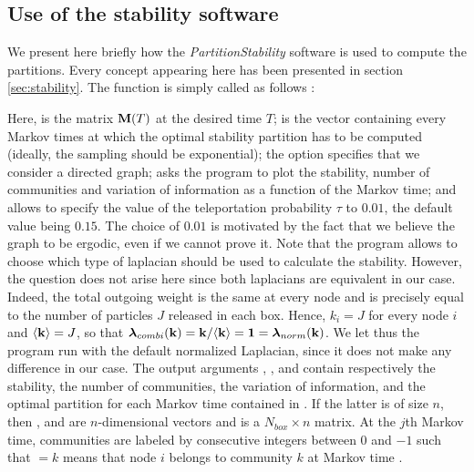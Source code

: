 \subsection{Use of the stability software}
We present here briefly how the \textit{PartitionStability} software is used to compute the partitions. Every concept appearing here has been presented in section \ref{sec:stability}. The  function is simply called as follows : \vspace{-.2cm}
\begin{center}
\end{center} %
Here,  is the matrix $\mathbf M(T)$ at the desired time $T$;  is the vector containing every Markov times at which the optimal stability partition has to be computed (ideally, the sampling should be exponential); the  option specifies that we consider a directed graph;  asks the program to plot the stability, number of communities and variation of information as a function of the Markov time; and  allows to specify the value of the teleportation probability $\tau$ to $0.01$, the default value being $0.15$. The choice of $0.01$ is motivated by the fact that we believe the graph to be ergodic, even if we cannot prove it. Note that the program allows to choose which type of laplacian should be used to calculate the stability. However, the question does not arise here since both laplacians are equivalent in our case. Indeed, the total outgoing weight is the same at every node and is precisely equal to the number of particles $J$ released in each box. Hence, $k_i = J$ for every node $i$ and $\langle \mathbf k \rangle = J$, so that $\boldsymbol \lambda_{combi}(\mathbf k) = \mathbf k/ \langle \mathbf k \rangle = \mathbf 1 = \boldsymbol \lambda_{norm}(\mathbf k)$. We let thus the program run with the default normalized Laplacian, since it does not make any difference in our case. The output arguments , ,  and  contain respectively the stability, the number of communities, the variation of information, and the optimal partition for each Markov time contained in . If the latter is of size $n$, then ,  and  are $n$-dimensional vectors and  is a $N_{box} \times n$ matrix. At the $j$th Markov time, communities are labeled by consecutive integers between $0$ and $-1$ such that  $= k$ means that node $i$ belongs to community $k$ at Markov time .  



